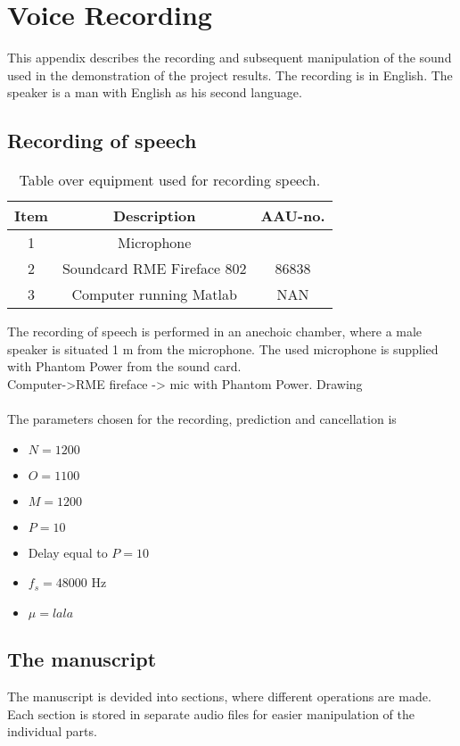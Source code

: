 \section{Voice Recording}
This appendix describes the recording and subsequent manipulation of the sound used in the demonstration of the project results. The recording is in English. The speaker is a man with English as his second language. 

\subsection{Recording of speech}
\begin{table}[H]
	\centering
	\begin{tabular}{ c c c } \toprule
		{Item}	& {Description} 						& {AAU-no}. \\ \bottomrule 
		1	& Microphone 	& 	\\
		2	& Soundcard RME Fireface 802	& 86838 		\\
		3	& Computer running Matlab	 & 	NAN	\\
		\bottomrule
	\end{tabular}
	\caption{Table over equipment used for recording speech.}
	\label{tab:VoiceRec}
\end{table}
The recording of speech is performed in an anechoic chamber, where a male speaker is situated 1 m from the microphone. The used microphone is supplied with Phantom Power from the sound card. \\ 
Computer->RME fireface -> mic with Phantom Power. Drawing\\\\

The parameters chosen for the recording, prediction and cancellation is
\begin{itemize}
	\item $N=1200$
	\item $O=1100$
	\item $M=1200$
	\item $P=10$
	\item Delay equal to $P=10$
	\item $f_s =48000$ Hz
	\item $\mu= lala$
\end{itemize}


\subsection{The manuscript}
The manuscript is devided into sections, where different operations are made. Each section is stored in separate audio files for easier manipulation of the individual parts. 
 
